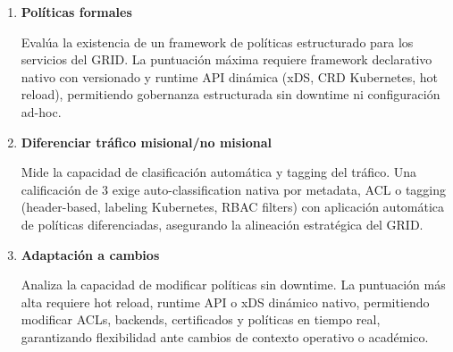\begin{enumerate}[resume*=criterios]
  \item \textbf{Políticas formales}

  Evalúa la existencia de un framework de políticas estructurado para los servicios del GRID. La puntuación máxima requiere framework declarativo nativo con versionado y runtime API dinámica (xDS, CRD Kubernetes, hot reload), permitiendo gobernanza estructurada sin downtime ni configuración ad-hoc.

  \item \textbf{Diferenciar tráfico misional/no misional}

  Mide la capacidad de clasificación automática y tagging del tráfico. Una calificación de 3 exige auto-classification nativa por metadata, ACL o tagging (header-based, labeling Kubernetes, RBAC filters) con aplicación automática de políticas diferenciadas, asegurando la alineación estratégica del GRID.

  \item \textbf{Adaptación a cambios}

  Analiza la capacidad de modificar políticas sin downtime. La puntuación más alta requiere hot reload, runtime API o xDS dinámico nativo, permitiendo modificar ACLs, backends, certificados y políticas en tiempo real, garantizando flexibilidad ante cambios de contexto operativo o académico.

\end{enumerate}
